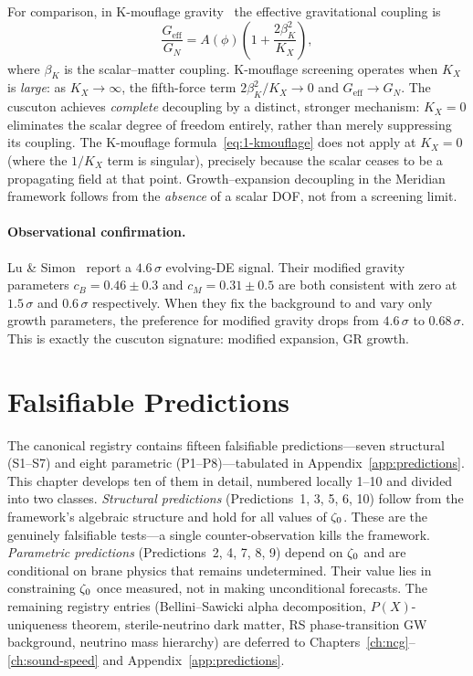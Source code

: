 For comparison, in K-mouflage gravity~\cite{ch1:bose-kmouflage} the effective gravitational coupling is
\begin{equation}
\label{eq:1-kmouflage}
\frac{G_{\mathrm{eff}}}{G_N} = A(\phi)\left(1 + \frac{2\beta_K^2}{K_X}\right)\!,
\end{equation}
where $\beta_K$ is the scalar--matter coupling. K-mouflage screening operates when $K_X$ is \emph{large}: as $K_X \to \infty$, the fifth-force term $2\beta_K^2/K_X \to 0$ and $G_{\mathrm{eff}} \to G_N$. The cuscuton achieves \emph{complete} decoupling by a distinct, stronger mechanism: $K_X = 0$ eliminates the scalar degree of freedom entirely, rather than merely suppressing its coupling. The K-mouflage formula~\eqref{eq:1-kmouflage} does not apply at $K_X = 0$ (where the $1/K_X$ term is singular), precisely because the scalar ceases to be a propagating field at that point. Growth--expansion decoupling in the Meridian framework follows from the \emph{absence} of a scalar DOF, not from a screening limit.

\paragraph{Observational confirmation.} Lu \& Simon~\cite{ch1:lu-simon} report a $4.6\,\sigma$ evolving-DE signal. Their modified gravity parameters $c_B = 0.46 \pm 0.3$ and $c_M = 0.31 \pm 0.5$ are both consistent with zero at $1.5\,\sigma$ and $0.6\,\sigma$ respectively. When they fix the background to \LCDM{} and vary only growth parameters, the preference for modified gravity drops from $4.6\,\sigma$ to $0.68\,\sigma$. This is exactly the cuscuton signature: modified expansion, GR growth.


\section{Falsifiable Predictions}
\label{sec:1-predictions}

The canonical registry contains fifteen falsifiable predictions---seven structural (S1--S7) and eight parametric (P1--P8)---tabulated in Appendix~\ref{app:predictions}. This chapter develops ten of them in detail, numbered locally 1--10 and divided into two classes. \emph{Structural predictions} (Predictions~1, 3, 5, 6, 10) follow from the framework's algebraic structure and hold for all values of $\zeta_0$. These are the genuinely falsifiable tests---a single counter-observation kills the framework. \emph{Parametric predictions} (Predictions~2, 4, 7, 8, 9) depend on $\zeta_0$ and are conditional on brane physics that remains undetermined. Their value lies in constraining $\zeta_0$ once measured, not in making unconditional forecasts. The remaining registry entries (Bellini--Sawicki alpha decomposition, $P(X)$-uniqueness theorem, sterile-neutrino dark matter, RS phase-transition GW background, neutrino mass hierarchy) are deferred to Chapters~\ref{ch:ncg}--\ref{ch:sound-speed} and Appendix~\ref{app:predictions}.

